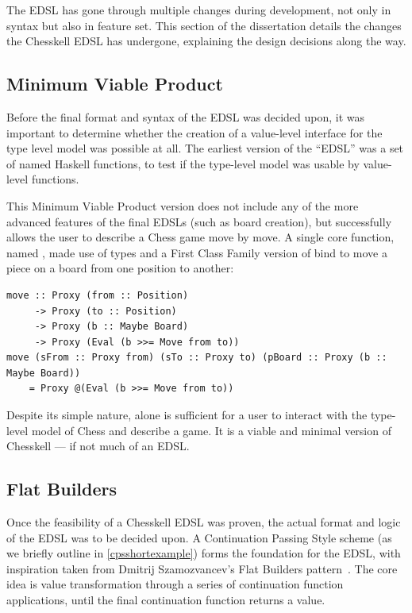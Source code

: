 The EDSL has gone through multiple changes during development, not only in syntax but also in feature set. This section of the dissertation details the changes the Chesskell EDSL has undergone, explaining the design decisions along the way.

\subsection{Minimum Viable Product}

Before the final format and syntax of the EDSL was decided upon, it was important to determine whether the creation of a value-level interface for the type level model was possible at all. The earliest version of the ``EDSL'' was a set of named Haskell functions, to test if the type-level model was usable by value-level functions.

This Minimum Viable Product version does not include any of the more advanced features of the final EDSLs (such as board creation), but successfully allows the user to describe a Chess game move by move. A single core function, named , made use of  types and a First Class Family version of bind to move a piece on a board from one position to another:

\begin{lstlisting}
move :: Proxy (from :: Position)
     -> Proxy (to :: Position)
     -> Proxy (b :: Maybe Board)
     -> Proxy (Eval (b >>= Move from to))
move (sFrom :: Proxy from) (sTo :: Proxy to) (pBoard :: Proxy (b :: Maybe Board))
    = Proxy @(Eval (b >>= Move from to))
\end{lstlisting}

Despite its simple nature,  alone is sufficient for a user to interact with the type-level model of Chess and describe a game. It is a viable and minimal version of Chesskell --- if not much of an EDSL.

\subsection{Flat Builders}

Once the feasibility of a Chesskell EDSL was proven, the actual format and logic of the EDSL was to be decided upon. A Continuation Passing Style scheme (as we briefly outline in \cref{cpsshortexample}) forms the foundation for the EDSL, with inspiration taken from Dmitrij Szamozvancev's Flat Builders pattern~\cite{mezzo}. The core idea is value transformation through a series of continuation function applications, until the final continuation function returns a value.

